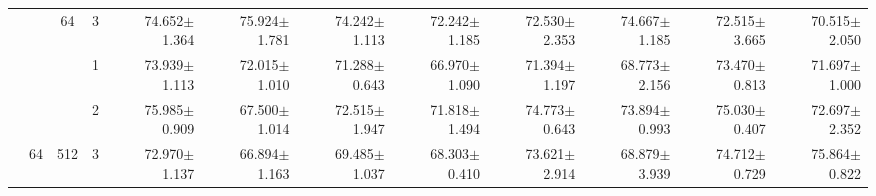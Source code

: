 \begin{table}[htpb]
{\begin{tabular}{c|c|c|c|rr|rr|rr|rr}
                                 &                                                                                 & \multirow{-3}{*}{64}                                                                   & 3                                                                                         & 74.652$\pm$1.364                        & 75.924$\pm$1.781                        & 74.242$\pm$1.113                        & 72.242$\pm$1.185                        & 72.530$\pm$2.353                        & 74.667$\pm$1.185                        & 72.515$\pm$3.665                        & 70.515$\pm$2.050                       \\ \cline{3-12} 
                                 &                                                                                 &                                                                                        & 1                                                                                         & 73.939$\pm$1.113                        & 72.015$\pm$1.010                        & 71.288$\pm$0.643                        & 66.970$\pm$1.090                        & 71.394$\pm$1.197                        & 68.773$\pm$2.156                        & 73.470$\pm$0.813                        & 71.697$\pm$1.000                       \\
                                 &                                                                                 &                                                                                        & 2                                                                                         & 75.985$\pm$0.909                        & 67.500$\pm$1.014                        & 72.515$\pm$1.947                        & 71.818$\pm$1.494                        & 74.773$\pm$0.643                        & 73.894$\pm$0.993                        & 75.030$\pm$0.407                        & 72.697$\pm$2.352                       \\
                                 & \multirow{-6}{*}{64}                                                            & \multirow{-3}{*}{512}                                                                  & 3                                                                                         & 72.970$\pm$1.137                        & 66.894$\pm$1.163                        & 69.485$\pm$1.037                        & 68.303$\pm$0.410                        & 73.621$\pm$2.914                        & 68.879$\pm$3.939                        & 74.712$\pm$0.729                        & 75.864$\pm$0.822                       \\ \cline{2-12} 

\end{tabular}}
\end{table}
